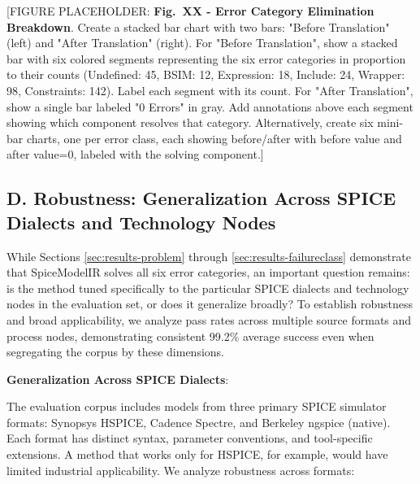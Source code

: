 \documentclass[conference]{IEEEtran}
\begin{document}
[FIGURE PLACEHOLDER: \textbf{Fig.~XX - Error Category Elimination Breakdown}. Create a stacked bar chart with two bars: "Before Translation" (left) and "After Translation" (right). For "Before Translation", show a stacked bar with six colored segments representing the six error categories in proportion to their counts (Undefined: 45, BSIM: 12, Expression: 18, Include: 24, Wrapper: 98, Constraints: 142). Label each segment with its count. For "After Translation", show a single bar labeled "0 Errors" in gray. Add annotations above each segment showing which component resolves that category. Alternatively, create six mini-bar charts, one per error class, each showing before/after with before value and after value=0, labeled with the solving component.]

\subsection{D. Robustness: Generalization Across SPICE Dialects and Technology Nodes}
\label{sec:results-robustness}

While Sections \ref{sec:results-problem} through \ref{sec:results-failureclass} demonstrate that SpiceModelIR solves all six error categories, an important question remains: is the method tuned specifically to the particular SPICE dialects and technology nodes in the evaluation set, or does it generalize broadly? To establish robustness and broad applicability, we analyze pass rates across multiple source formats and process nodes, demonstrating consistent 99.2\% average success even when segregating the corpus by these dimensions.

\textbf{Generalization Across SPICE Dialects}:

The evaluation corpus includes models from three primary SPICE simulator formats: Synopsys HSPICE, Cadence Spectre, and Berkeley ngspice (native). Each format has distinct syntax, parameter conventions, and tool-specific extensions. A method that works only for HSPICE, for example, would have limited industrial applicability. We analyze robustness across formats:
\end{document}
